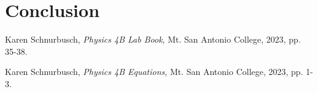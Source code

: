 \documentclass[12pt]{iopart} %
\begin{document}
\section{Conclusion}

\begin{thebibliography}{9}

  Karen Schnurbusch,
  \textit{Physics 4B Lab Book},
  Mt. San Antonio College,
  2023,
  pp. 35-38.

  Karen Schnurbusch,
  \textit{Physics 4B Equations},
  Mt. San Antonio College,
  2023,
  pp. 1-3.

\end{thebibliography}
\end{document}
